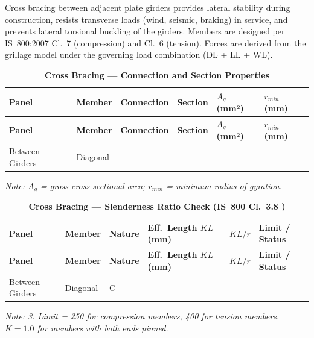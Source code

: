 \documentclass[12pt,a4paper]{report}
\numberwithin{table}{chapter}
\numberwithin{figure}{chapter}
\begin{document}
Cross bracing between adjacent plate girders provides lateral stability during construction, resists transverse loads (wind, seismic, braking) in service, and prevents lateral torsional buckling of the girders. Members are designed per IS~800:2007 Cl.~7 (compression) and Cl.~6 (tension). Forces are derived from the grillage model under the governing load combination  (DL + LL + WL).

\vspace{1em}

\vspace{0.4em}
\noindent
\setlength{\tabcolsep}{4pt}
\setlength\LTleft{0pt}
\setlength\LTright{\fill}

\begin{longtable}{|C{2.0cm}|L{2.0cm}|L{2.2cm}|C{2.5cm}|C{2.0cm}|C{2.0cm}|}
\caption{\textbf{Cross Bracing --- Connection and Section Properties}}
\hline
{} \textbf{Panel} & \textbf{Member} & \textbf{Connection} & \textbf{Section} & \textbf{$A_g$ (mm²)} & \textbf{$r_{min}$ (mm)} \\[6pt]
\hline
\endfirsthead
\hline
{} \textbf{Panel} & \textbf{Member} & \textbf{Connection} & \textbf{Section} & \textbf{$A_g$ (mm²)} & \textbf{$r_{min}$ (mm)} \\[6pt]
\hline
\endhead
Between Girders & Diagonal &  &  &  &  \\[6pt]
\hline
\end{longtable}
\noindent\textit{Note: $A_g$ = gross cross-sectional area; $r_{min}$ = minimum radius of gyration.}

\vspace{1em}
\begin{longtable}{|C{2.2cm}|L{2.2cm}|L{2.5cm}|C{2.5cm}|C{2.5cm}|>{\centering\arraybackslash}p{3.6cm}|}
\caption{\textbf{Cross Bracing --- Slenderness Ratio Check (IS~800 Cl.~3.8 )}}
\hline
{} \textbf{Panel} & \textbf{Member} & \textbf{Nature} & \textbf{Eff.\ Length $KL$ (mm)} & \textbf{$KL/r$} & \textbf{Limit / Status} \\[6pt]
\hline
\endfirsthead
\hline
{} \textbf{Panel} & \textbf{Member} & \textbf{Nature} & \textbf{Eff.\ Length $KL$ (mm)} & \textbf{$KL/r$} & \textbf{Limit / Status} \\[6pt]
\hline
\endhead
Between Girders & Diagonal & C &  &  &  ---  \\[6pt]
\hline
\end{longtable}
\noindent\textit{Note:  3. Limit = 250 for compression members, 400 for tension members. $K = 1.0$ for members with both ends pinned.}
\end{document}
